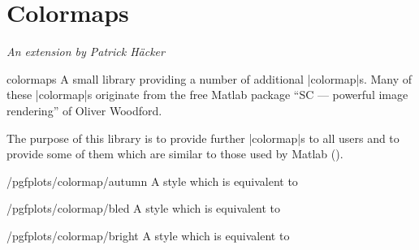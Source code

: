 \section{Colormaps}
\begingroup
\def\pgfplotsmanualcurlibrary{colormaps}

{\emph{An extension by Patrick H\"acker}}


\begin{pgfplotslibrary}{colormaps}
	A small library providing a number of additional |colormap|s. Many of these |colormap|s originate from the free Matlab package ``SC --- powerful image rendering'' of Oliver Woodford.
	
	The purpose of this library is to provide further |colormap|s to all users and to provide some of them which are similar to those used by Matlab (\textregistered).

\begin{stylekey}{/pgfplots/colormap/autumn}
	A style which is equivalent to 
\begin{codeexample}
\end{codeexample}


	\matlabcolormaptext
\end{stylekey}

\begin{stylekey}{/pgfplots/colormap/bled}
	A style which is equivalent to 
\begin{codeexample}
\end{codeexample}


	\matlabcolormaptext
\end{stylekey}

\begin{stylekey}{/pgfplots/colormap/bright}
	A style which is equivalent to 
\begin{codeexample}
\end{codeexample}



\end{stylekey}
\end{pgfplotslibrary}
